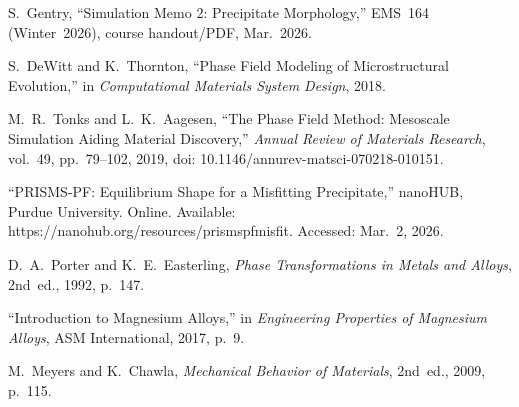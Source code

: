 \documentclass[11pt]{article}
\begin{document}
\noindent [2] S.~Gentry, ``Simulation Memo 2: Precipitate Morphology,''
EMS~164 (Winter~2026), course handout/PDF, Mar.~2026.

\noindent [3] S.~DeWitt and K.~Thornton, ``Phase Field Modeling of
Microstructural Evolution,'' in \emph{Computational Materials System Design},
2018.

\noindent [4] M.~R.~Tonks and L.~K.~Aagesen, ``The Phase Field Method:
Mesoscale Simulation Aiding Material Discovery,''
\emph{Annual Review of Materials Research}, vol.~49, pp.~79--102, 2019,
doi: 10.1146/annurev-matsci-070218-010151.

\noindent [5] ``PRISMS-PF: Equilibrium Shape for a Misfitting Precipitate,''
nanoHUB, Purdue University. Online. Available:
https://nanohub.org/resources/prismspfmisfit. Accessed: Mar.~2, 2026.

\noindent [6] D.~A.~Porter and K.~E.~Easterling,
\emph{Phase Transformations in Metals and Alloys}, 2nd~ed., 1992, p.~147.

\noindent [7] ``Introduction to Magnesium Alloys,'' in
\emph{Engineering Properties of Magnesium Alloys}, ASM International, 2017,
p.~9.

\noindent [8] M.~Meyers and K.~Chawla, \emph{Mechanical Behavior of Materials},
2nd~ed., 2009, p.~115.
\end{document}
